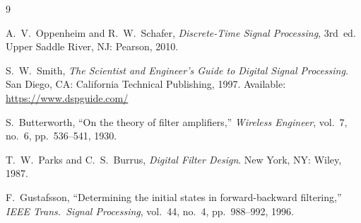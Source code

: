 \documentclass[11pt,a4paper]{article}
\begin{document}
\begin{thebibliography}{9}

A.~V.~Oppenheim and R.~W.~Schafer,
\emph{Discrete-Time Signal Processing}, 3rd~ed.
Upper Saddle River, NJ: Pearson, 2010.

S.~W.~Smith,
\emph{The Scientist and Engineer's Guide to Digital Signal Processing}.
San Diego, CA: California Technical Publishing, 1997.
Available: \url{https://www.dspguide.com/}

S.~Butterworth,
``On the theory of filter amplifiers,''
\emph{Wireless Engineer}, vol.~7, no.~6, pp.~536--541, 1930.

T.~W.~Parks and C.~S.~Burrus,
\emph{Digital Filter Design}.
New York, NY: Wiley, 1987.

F.~Gustafsson,
``Determining the initial states in forward-backward filtering,''
\emph{IEEE Trans.\ Signal Processing}, vol.~44, no.~4, pp.~988--992, 1996.

\end{thebibliography}
\end{document}
